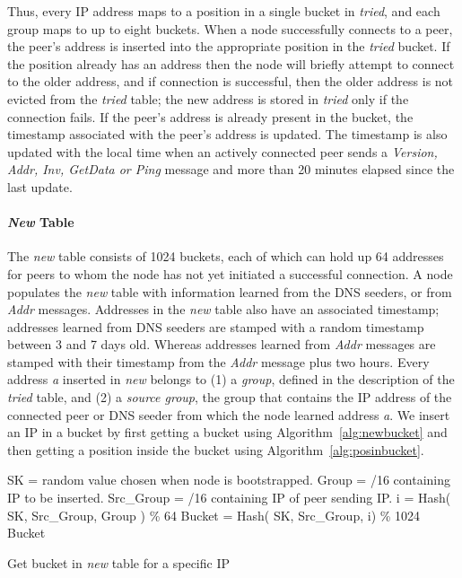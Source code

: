 Thus, every IP address maps to a position in a single bucket in \emph{tried}, and each group maps to up to eight buckets. When a node successfully connects to a peer, the peer’s address is inserted into the appropriate position in the \emph{tried} bucket. If the position already has an address then the node will briefly attempt to connect to the older address, and if connection is successful, then the older address is not evicted from the \emph{tried} table; the new address is stored in \emph{tried} only if the connection fails. If the peer’s address is already present in the bucket, the timestamp associated with the peer’s address is updated. The timestamp is also updated with the local time when an actively connected peer sends a \textsl{Version, Addr, Inv, GetData or Ping} message and more than 20 minutes elapsed since the last update.

\paragraph*{\emph{New} Table}
The \emph{new} table consists of 1024 buckets, each of which can hold up 64 addresses for peers to whom the node has not yet initiated a successful connection. A node populates the \emph{new} table with information learned from the DNS seeders, or from \textsl{Addr} messages. Addresses in the \emph{new} table also have an associated timestamp; addresses learned from DNS seeders are stamped with a random timestamp between 3 and 7 days old. Whereas addresses learned from \textsl{Addr} messages are stamped with their timestamp from the \textsl{Addr} message plus two hours.
Every address \textsl{a} inserted in \emph{new} belongs to (1) a \textsl{group}, defined in the description of the \emph{tried} table, and (2) a \textsl{source group}, the group that contains the IP address of the connected peer or DNS seeder from which the node learned address \textsl{a}. We insert an IP in a bucket by first getting a bucket using Algorithm~\ref{alg:newbucket} and then getting a position inside the bucket using Algorithm~\ref{alg:posinbucket}.

\begin{algorithm}
\begin{algorithmic}[1]
\State SK = random value chosen when node is bootstrapped.
\State Group = /16 containing IP to be inserted.
\State Src\_Group = /16 containing IP of peer sending IP.
\State
\State i = Hash( SK, Src\_Group, Group ) \% 64
\State Bucket = Hash( SK, Src\_Group, i) \% 1024
\State \Return Bucket
\end{algorithmic}
\caption{Get bucket in \emph{new} table for a specific IP}
\label{alg:newbucket}
\end{algorithm}


